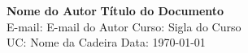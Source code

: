 \documentclass[a4paper, 11pt]{article}
\begin{document}
    \textsf{\noindent \large\textbf{Nome do Autor} \hfill \textbf{Título do Documento}\\
    E-mail: E-mail do Autor %
    \hfill Curso: Sigla do Curso\\
    \normalsize UC: Nome da Cadeira \hfill Data: \today}

    
    
\end{document}
